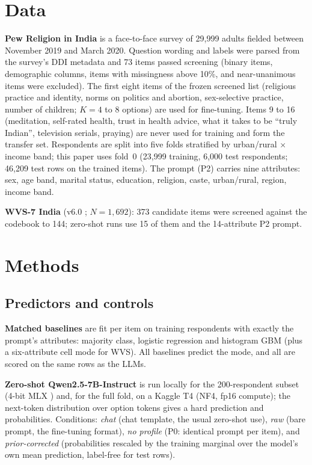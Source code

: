 \documentclass[conference]{IEEEtran}
\begin{document}
\section{Data}

\textbf{Pew Religion in India} \cite{pew2021} is a face-to-face survey of 29{,}999 adults fielded between November 2019 and March 2020. Question wording and labels were parsed from the survey's DDI metadata and 73 items passed screening (binary items, demographic columns, items with missingness above 10\%, and near-unanimous items were excluded). The first eight items of the frozen screened list (religious practice and identity, norms on politics and abortion, sex-selective practice, number of children; $K=4$ to 8 options) are used for fine-tuning. Items 9 to 16 (meditation, self-rated health, trust in health advice, what it takes to be ``truly Indian'', television serials, praying) are never used for training and form the transfer set. Respondents are split into five folds stratified by urban/rural $\times$ income band; this paper uses fold~0 (23{,}999 training, 6{,}000 test respondents; 46{,}209 test rows on the trained items). The prompt (P2) carries nine attributes: sex, age band, marital status, education, religion, caste, urban/rural, region, income band.

\textbf{WVS-7 India} (v6.0 \cite{wvs7}; $N=1{,}692$): 373 candidate items were screened against the codebook to 144; zero-shot runs use 15 of them and the 14-attribute P2 prompt.

\section{Methods}

\subsection{Predictors and controls}

\textbf{Matched baselines} are fit per item on training respondents with exactly the prompt's attributes: majority class, logistic regression and histogram GBM \cite{pedregosa2011} (plus a six-attribute cell mode for WVS). All baselines predict the mode, and all are scored on the same rows as the LLMs.

\textbf{Zero-shot Qwen2.5-7B-Instruct} \cite{qwen2025} is run locally for the 200-respondent subset (4-bit MLX \cite{mlx2023}) and, for the full fold, on a Kaggle T4 (NF4, fp16 compute); the next-token distribution over option tokens gives a hard prediction and probabilities. Conditions: \emph{chat} (chat template, the usual zero-shot use), \emph{raw} (bare prompt, the fine-tuning format), \emph{no profile} (P0: identical prompt per item), and \emph{prior-corrected} (probabilities rescaled by the training marginal over the model's own mean prediction, label-free for test rows).
\end{document}
